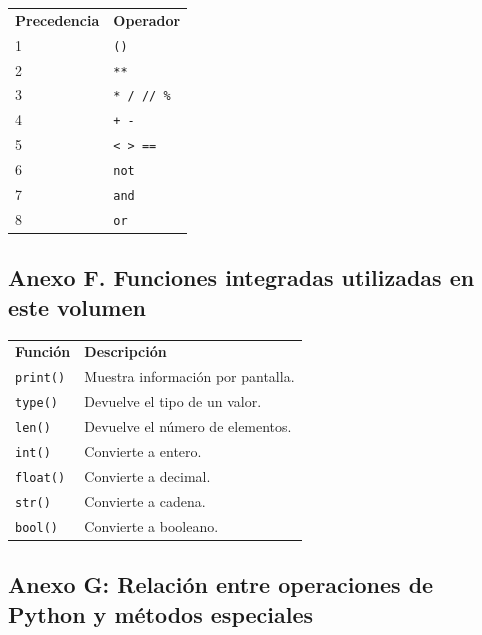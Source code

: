 \documentclass[11pt,a5paper,twoside]{book}
\begin{document}
\begin{tcolorbox}
\begin{tabular}{ll}
\textbf{Precedencia} & \textbf{Operador} \\
1 & {\scriptsize \texttt{()}} \\
2 & {\scriptsize \texttt{**}} \\
3 & {\scriptsize \texttt{* / // \%}} \\
4 & {\scriptsize \texttt{+ -}} \\
5 & {\scriptsize \texttt{\textless{} \textgreater{} ==}} \\
6 & {\scriptsize \texttt{not}} \\
7 & {\scriptsize \texttt{and}} \\
8 & {\scriptsize \texttt{or}} \\
\end{tabular}
\end{tcolorbox}

\newpage
\subsection{Anexo F. Funciones integradas utilizadas en este volumen}

\begin{tcolorbox}
\begin{tabular}{ll}
 \textbf{Función}    &  \textbf{Descripción}                        \\
 {\scriptsize \texttt{print()}}  &  Muestra información por pantalla.  \\
 {\scriptsize \texttt{type()}}   &  Devuelve el tipo de un valor.      \\
 {\scriptsize \texttt{len()}}    &  Devuelve el número de elementos.   \\
 {\scriptsize \texttt{int()}}    &  Convierte a entero.                \\
 {\scriptsize \texttt{float()}}  &  Convierte a decimal.               \\
 {\scriptsize \texttt{str()}}    &  Convierte a cadena.                \\
 {\scriptsize \texttt{bool()}}   &  Convierte a booleano.              \\
\end{tabular}
\end{tcolorbox}

\newpage
\subsection{Anexo G: Relación entre operaciones de Python y métodos especiales}
\end{document}
